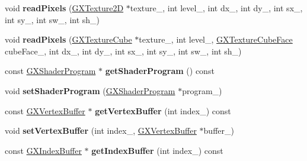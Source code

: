 \begin{DoxyCompactItemize}
\item 
void {\bfseries read\+Pixels} (\hyperlink{class_i_dream_sky_1_1_g_x_texture2_d}{G\+X\+Texture2D} $\ast$texture\+\_\+, int level\+\_\+, int dx\+\_\+, int dy\+\_\+, int sx\+\_\+, int sy\+\_\+, int sw\+\_\+, int sh\+\_\+)\hypertarget{class_i_dream_sky_1_1_g_x_context_ae62a2adb036d7640f9e0d322f8a06789}{}\label{class_i_dream_sky_1_1_g_x_context_ae62a2adb036d7640f9e0d322f8a06789}

\item 
void {\bfseries read\+Pixels} (\hyperlink{class_i_dream_sky_1_1_g_x_texture_cube}{G\+X\+Texture\+Cube} $\ast$texture\+\_\+, int level\+\_\+, \hyperlink{class_i_dream_sky_1_1_g_x_texture_cube_face}{G\+X\+Texture\+Cube\+Face} cube\+Face\+\_\+, int dx\+\_\+, int dy\+\_\+, int sx\+\_\+, int sy\+\_\+, int sw\+\_\+, int sh\+\_\+)\hypertarget{class_i_dream_sky_1_1_g_x_context_ae702cb140e5e7c9f6357b90c35bd4ee2}{}\label{class_i_dream_sky_1_1_g_x_context_ae702cb140e5e7c9f6357b90c35bd4ee2}

\item 
const \hyperlink{class_i_dream_sky_1_1_g_x_shader_program}{G\+X\+Shader\+Program} $\ast$ {\bfseries get\+Shader\+Program} () const \hypertarget{class_i_dream_sky_1_1_g_x_context_af74befdccce27cc038f6ed0189868760}{}\label{class_i_dream_sky_1_1_g_x_context_af74befdccce27cc038f6ed0189868760}

\item 
void {\bfseries set\+Shader\+Program} (\hyperlink{class_i_dream_sky_1_1_g_x_shader_program}{G\+X\+Shader\+Program} $\ast$program\+\_\+)\hypertarget{class_i_dream_sky_1_1_g_x_context_a5c46606bfd45a766cce6d44668b7803c}{}\label{class_i_dream_sky_1_1_g_x_context_a5c46606bfd45a766cce6d44668b7803c}

\item 
const \hyperlink{class_i_dream_sky_1_1_g_x_vertex_buffer}{G\+X\+Vertex\+Buffer} $\ast$ {\bfseries get\+Vertex\+Buffer} (int index\+\_\+) const \hypertarget{class_i_dream_sky_1_1_g_x_context_ac45a798d1e64ec28c93b9ed4d15af0be}{}\label{class_i_dream_sky_1_1_g_x_context_ac45a798d1e64ec28c93b9ed4d15af0be}

\item 
void {\bfseries set\+Vertex\+Buffer} (int index\+\_\+, \hyperlink{class_i_dream_sky_1_1_g_x_vertex_buffer}{G\+X\+Vertex\+Buffer} $\ast$buffer\+\_\+)\hypertarget{class_i_dream_sky_1_1_g_x_context_ace0081c29461b0a0239ed116ca63cd4a}{}\label{class_i_dream_sky_1_1_g_x_context_ace0081c29461b0a0239ed116ca63cd4a}

\item 
const \hyperlink{class_i_dream_sky_1_1_g_x_index_buffer}{G\+X\+Index\+Buffer} $\ast$ {\bfseries get\+Index\+Buffer} (int index\+\_\+) const \hypertarget{class_i_dream_sky_1_1_g_x_context_a40da427018dd17072bbf0ca39d51df8c}{}\label{class_i_dream_sky_1_1_g_x_context_a40da427018dd17072bbf0ca39d51df8c}


\end{DoxyCompactItemize}
